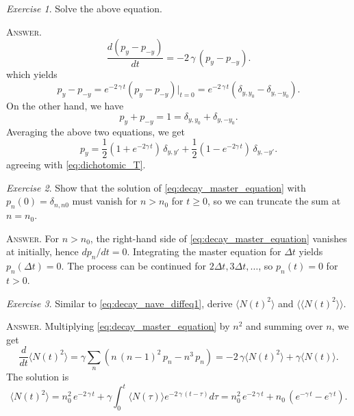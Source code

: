 \documentclass{book}
\numberwithin{equation}{section}
\theoremstyle{plain}
\theoremstyle{definition}
\theoremstyle{remark}
\theoremstyle{BoldStyle}
\newtheorem{exercise}{Exercise}
\numberwithin{exercise}{section}
\newcommand{\answer}[1]{{\color{DarkBlue}\footnotesize \textsc{Answer.} #1}}
\begin{document}
\begin{exercise}
  Solve the above equation.

  \answer{
  $$
  \frac{ d ( p_y - p_{-y} ) } { dt }
  = -2 \, \gamma \, (p_y - p_{-y} ).
  $$
  which yields
  $$
  p_y - p_{-y} = e^{-2 \, \gamma \, t} (p_y - p_{-y})\big|_{t = 0}
  = e^{-2\, \gamma \, t} (\delta_{y, y_0} - \delta_{y, -y_0}).
  $$
  On the other hand, we have
  $$
  p_y + p_{-y} = 1 = \delta_{y, y_0} + \delta_{y, -y_0}.
  $$
  Averaging the above two equations, we get
  $$
  p_y
  = \frac{1}{2}(1 + e^{-2\gamma \, t}) \, \delta_{y, y'}
  +\frac{1}{2}(1 - e^{-2\gamma \, t}) \, \delta_{y, -y'}.
  $$
  agreeing with \eqref{eq:dichotomic_T}.
  }
\end{exercise}

\begin{exercise}
  Show that the solution of \eqref{eq:decay_master_equation}
  with $p_n(0) = \delta_{n, n0}$
  must vanish for $n > n_0$ for $t \ge 0$,
  so we can truncate the sum at $n = n_0$.

  \answer{
  For $n > n_0$, the right-hand side of \eqref{eq:decay_master_equation}
  vanishes at initially, hence $dp_n/dt = 0$.
  Integrating the master equation for $\Delta t$ yields $p_n(\Delta t) = 0$.
  The process can be continued for $2 \Delta t, 3 \Delta t, \dots$,
  so $p_n(t) = 0$ for $t > 0$.
  }
\end{exercise}

\begin{exercise}
  Similar to \eqref{eq:decay_nave_diffeq1}, derive
  $\langle N(t)^2 \rangle$ and
  $\langle\langle N(t)^2 \rangle\rangle$.

  \answer{
    Multiplying \eqref{eq:decay_master_equation} by $n^2$
    and summing over $n$, we get
    $$
    \frac{ d } { d t } \langle N(t)^2 \rangle
    =
    \gamma \sum_{n} \left( n \, (n-1)^2 \, p_n - n^3 \, p_n \right)
    =
    - 2 \, \gamma \langle N(t)^2 \rangle
    + \gamma \langle N(t) \rangle.
    $$
    The solution is
    $$
    \langle N(t)^2 \rangle
    =
    n_0^2 \, e^{-2\,\gamma \, t}
    + \gamma \int_0^t \langle N(\tau)\rangle e^{-2\, \gamma \, (t - \tau)} d\tau
    =
    n_0^2 \, e^{-2\,\gamma \, t}
    +
    n_0 \, \left(e^{-\gamma \, t} - e^{\gamma \, t} \right).
    $$
  }
\end{exercise}
\end{document}
